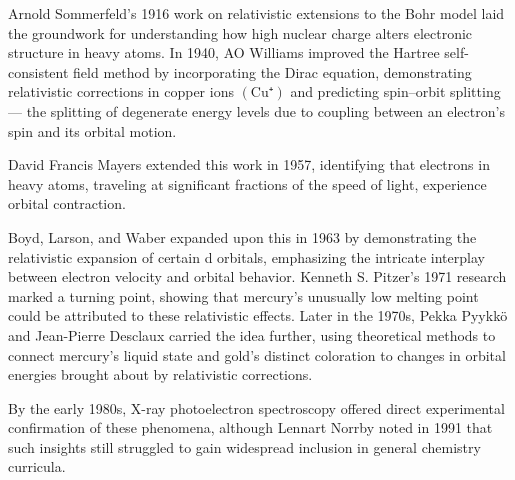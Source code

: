 \begin{historical}
Arnold Sommerfeld’s 1916 work on relativistic extensions to the Bohr model laid the groundwork for understanding how high nuclear charge alters electronic structure in heavy atoms. In 1940, AO Williams improved the Hartree self-consistent field method by incorporating the Dirac equation, demonstrating relativistic corrections in copper ions $(\text{Cu}⁺)$ and predicting spin–orbit splitting — the splitting of degenerate energy levels due to coupling between an electron’s spin and its orbital motion.

David Francis Mayers extended this work in 1957, identifying that electrons in heavy atoms, traveling at significant fractions of the speed of light, experience orbital contraction.

Boyd, Larson, and Waber expanded upon this in 1963 by demonstrating the relativistic expansion of certain d orbitals, emphasizing the intricate interplay between electron velocity and orbital behavior. Kenneth S. Pitzer’s 1971 research marked a turning point, showing that mercury’s unusually low melting point could be attributed to these relativistic effects. Later in the 1970s, Pekka Pyykkö and Jean-Pierre Desclaux carried the idea further, using theoretical methods to connect mercury’s liquid state and gold’s distinct coloration to changes in orbital energies brought about by relativistic corrections.

By the early 1980s, X-ray photoelectron spectroscopy offered direct experimental confirmation of these phenomena, although Lennart Norrby noted in 1991 that such insights still struggled to gain widespread inclusion in general chemistry curricula.
\end{historical}
